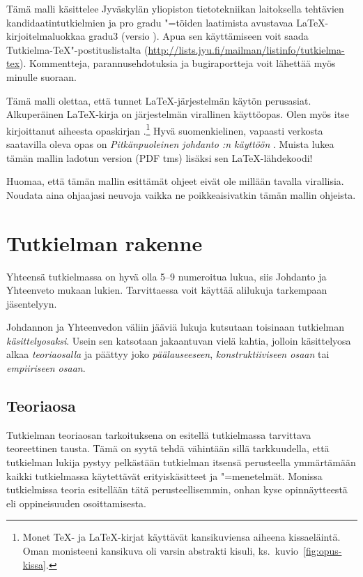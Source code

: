 \documentclass[utf8]{gradu3}
\begin{document}
Tämä malli käsittelee Jyväskylän yliopiston tietotekniikan laitoksella
tehtävien kandidaatintutkielmien ja pro gradu "=töiden laatimista
avustavaa \LaTeX-kirjoitelmaluokkaa gradu3 (versio \graduclsversion).
Apua sen käyttämiseen voit saada Tutkielma-TeX"-postituslistalta
(\url{http://lists.jyu.fi/mailman/listinfo/tutkielma-tex}).
Kommentteja, parannusehdotuksia ja bugiraportteja voit lähettää myös
minulle suoraan.

Tämä malli olettaa, että tunnet \LaTeX-järjestelmän käytön perusasiat.
Alkuperäinen \LaTeX-kirja \parencite{lamport94:_latex} on järjestelmän
virallinen käyttöopas.  Olen myös itse kirjoittanut aiheesta
opaskirjan \parencite{kaijanaho03:_latex_ams_latex}.\footnote{Monet
  \TeX- ja \LaTeX-kirjat käyttävät kansikuviensa aiheena kissaeläintä.
  Oman monisteeni kansikuva oli varsin abstrakti kisuli,
  ks.~kuvio~\ref{fig:opus-kissa}.}  Hyvä suomenkielinen, vapaasti
verkosta saatavilla oleva opas on \textit{Pitkänpuoleinen johdanto
  \LaTeXe:n käyttöön} \parencite{oetiker:_pitka_latex}.  Muista lukea
tämän mallin ladotun version (PDF tms) lisäksi sen \LaTeX-lähdekoodi!

Huomaa, että tämän mallin esittämät ohjeet eivät ole millään tavalla
virallisia.  Noudata aina ohjaajasi neuvoja vaikka ne poikkeaisivatkin
tämän mallin ohjeista.

\chapter{Tutkielman rakenne}

Yhteensä tutkielmassa on hyvä olla 5–9 numeroitua
lukua, siis Johdanto ja Yhteenveto mukaan lukien.  Tarvittaessa voit
käyttää alilukuja tarkempaan jäsentelyyn.

Johdannon ja Yhteenvedon väliin jääviä lukuja kutsutaan toisinaan
tutkielman \textit{käsittelyosaksi}.  Usein sen katsotaan jakaantuvan
vielä kahtia, jolloin käsittelyosa alkaa \textit{teoriaosalla} ja
päättyy joko \textit{päälauseeseen}, \textit{konstruktiiviseen osaan}
tai \textit{empiiriseen osaan}.

\section{Teoriaosa}

Tutkielman teoriaosan tarkoituksena on esitellä tutkielmassa
tarvittava teoreettinen tausta.  Tämä on syytä tehdä vähintään sillä
tarkkuudella, että tutkielman lukija pystyy pelkästään tutkielman
itsensä perusteella ymmärtämään kaikki tutkielmassa käytettävät
erityiskäsitteet ja "=menetelmät.  Monissa tutkielmissa teoria
esitellään tätä perusteellisemmin, onhan kyse opinnäytteestä eli
oppineisuuden osoittamisesta.
\end{document}
